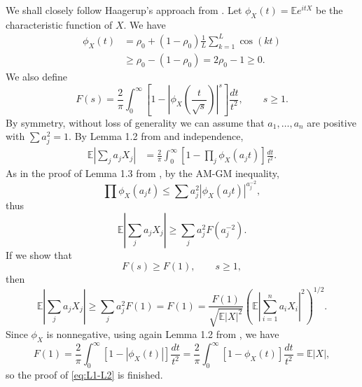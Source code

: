 \documentclass[10pt]{article}
\newcommand{\E}{\mathbb{E}}
\newcommand{\1}{\textbf{1}}
\theoremstyle{remark}
\theoremstyle{definition}
\begin{document}
We shall closely follow Haagerup's approach from \cite{Haa}. Let $\phi_X(t) = \E e^{itX}$ be the characteristic function of $X$. We have
\begin{align*}
\phi_X(t) &= \rho_0 + (1-\rho_0)\frac{1}{L}\sum_{k=1}^L \cos(kt) \\
&\geq \rho_0 -(1-\rho_0) = 2\rho_0 -1 \geq 0.
\end{align*}
We also define
\[
F(s) = \frac{2}{\pi}\int_0^\infty\left[1 - \left|\phi_X\left(\frac{t}{\sqrt{s}}\right)\right|^s\right]\frac{dt}{t^2}, \qquad s \geq 1.
\]
By symmetry, without loss of generality we can assume that $a_1, \ldots, a_n$ are positive with $\sum a_j^2 = 1$. By Lemma 1.2 from \cite{Haa} and independence,
\begin{align*}
\E\left|\sum_j a_j X_j\right| &= \frac{2}{\pi}\int_0^\infty \left[ 1 - \prod_j \phi_X(a_jt) \right] \frac{dt}{t^2}.
\end{align*}
As in the proof of Lemma 1.3 from \cite{Haa}, by the AM-GM inequality, 
\[
\prod \phi_X(a_jt) \leq \sum a_j^{2}|\phi_X(a_jt)|^{a_j^{-2}},
\]
thus
\[
\E\left|\sum_j a_j X_j\right| \geq \sum_j a_j^2F(a_j^{-2}).
\]
If we show that
\begin{equation}\label{eq:F>F(1)}
F(s) \geq F(1), \qquad s \geq 1,
\end{equation}
then
\[
\E\left|\sum_j a_j X_j\right| \geq \sum_j a_j^2F(1) = F(1) = \frac{F(1)}{\sqrt{\E |X|^2}}\left(\E\left|\sum_{i=1}^n a_iX_i \right|^2\right)^{1/2}.
\]
Since $\phi_X$ is nonnegative, using again Lemma 1.2 from \cite{Haa}, we have 
\[
F(1) = \frac{2}{\pi}\int_0^\infty\left[1 - \left|\phi_X\left(t\right)\right|\right]\frac{dt}{t^2} = \frac{2}{\pi}\int_0^\infty\left[1 - \phi_X\left(t\right)\right]\frac{dt}{t^2} = \E|X|,
\]
so the proof of \eqref{eq:L1-L2} is finished. 
\end{document}

